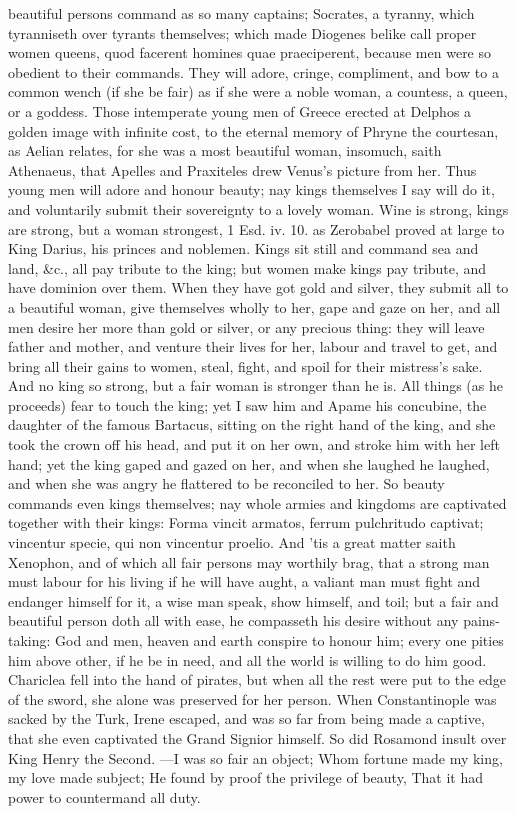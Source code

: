 {beautiful persons command as so many captains; Socrates, a tyranny,
which tyranniseth over tyrants themselves; which made Diogenes belike
call proper women queens, quod facerent homines quae praeciperent,
because men were so obedient to their commands. They will adore,
cringe, compliment, and bow to a common wench (if she be fair) as if
she were a noble woman, a countess, a queen, or a goddess. Those
intemperate young men of Greece erected at Delphos a golden image with
infinite cost, to the eternal memory of Phryne the courtesan, as Aelian
relates, for she was a most beautiful woman, insomuch, saith
Athenaeus, that Apelles and Praxiteles drew Venus's picture from
her. Thus young men will adore and honour beauty; nay kings themselves
I say will do it, and voluntarily submit their sovereignty to a lovely
woman. Wine is strong, kings are strong, but a woman strongest, 1 Esd.
iv. 10. as Zerobabel proved at large to King Darius, his princes and
noblemen. Kings sit still and command sea and land, \&c., all pay
tribute to the king; but women make kings pay tribute, and have
dominion over them. When they have got gold and silver, they submit all
to a beautiful woman, give themselves wholly to her, gape and gaze on
her, and all men desire her more than gold or silver, or any precious
thing: they will leave father and mother, and venture their lives for
her, labour and travel to get, and bring all their gains to women,
steal, fight, and spoil for their mistress's sake. And no king so
strong, but a fair woman is stronger than he is. All things (as
he proceeds) fear to touch the king; yet I saw him and Apame his
concubine, the daughter of the famous Bartacus, sitting on the right
hand of the king, and she took the crown off his head, and put it on
her own, and stroke him with her left hand; yet the king gaped and
gazed on her, and when she laughed he laughed, and when she was angry
he flattered to be reconciled to her. So beauty commands even kings
themselves; nay whole armies and kingdoms are captivated together with
their kings: Forma vincit armatos, ferrum pulchritudo captivat;
vincentur specie, qui non vincentur proelio. And 'tis a great matter
saith Xenophon, and of which all fair persons may worthily brag,
that a strong man must labour for his living if he will have aught, a
valiant man must fight and endanger himself for it, a wise man speak,
show himself, and toil; but a fair and beautiful person doth all with
ease, he compasseth his desire without any pains-taking: God and men,
heaven and earth conspire to honour him; every one pities him above
other, if he be in need, and all the world is willing to do him
good. Chariclea fell into the hand of pirates, but when all the
rest were put to the edge of the sword, she alone was preserved for her
person. When Constantinople was sacked by the Turk, Irene
escaped, and was so far from being made a captive, that she even
captivated the Grand Signior himself. So did Rosamond insult over King
Henry the Second.
---I was so fair an object;
Whom fortune made my king, my love made subject;
He found by proof the privilege of beauty,
That it had power to countermand all duty.

}
